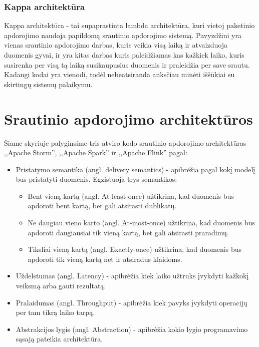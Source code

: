 \documentclass{VUMIFPSkursinis}
\begin{document}
\subsubsection{Kappa architektūra}

Kappa architektūra - tai supaprastinta lambda architektūra, kuri vietoj paketinio apdorojimo naudoja papildomą srautinio apdorojimo sistemą. Pavyzdžiui yra vienas srautinio apdorojimo darbas, kuris veikia visą laiką
ir atvaizduoja duomenis gyvai, ir yra kitas darbas kuris paleidžiamas kas kažkiek laiko, kuris susirenka per visą tą laiką susikaupusius duomenis ir praleidžia per save srautu. Kadangi kodai yra vienodi, todėl
nebeatsiranda anksčiau minėti iššūkiai su skirtingų sistemų palaikymu\cite{kreps2014questioning, kappa}.

\section{Srautinio apdorojimo architektūros} \label{srautarch}
Šiame skyriuje palyginsime tris atviro kodo srautinio apdorojimo architektūras ,,Apache Storm'', ,,Apache Spark'' ir ,,Apache Flink'' pagal:
\begin{itemize}
    \item Pristatymo semantika (angl. delivery semantics) - apibrėžia pagal kokį modelį bus pristatyti duomenis. Egzistuoja trys semantikos\cite{ensar20}: 
    \begin{itemize}
        \item Bent vieną kartą (angl. At-least-once) užtikrina, kad duomenis bus apdoroti bent kartą, bet gali atsirasti dublikatų. 
        \item Ne daugiau vieno karto (angl. At-most-once) užtikrina, kad duomenis bus apdoroti daugiausiai tik vieną kartą, bet gali atsirasti praradimų. 
        \item Tiksliai vieną kartą (angl. Exactly-once) užtikrina, kad duomenis bus apdoroti tik vieną kartą net ir atsiradus klaidoms.
    \end{itemize}
    \item Uždelstumas (angl. Latency) - apibrėžia kiek laiko užtruks įvykdyti kažkokį veiksmą arba gauti rezultatą.
    \item Pralaidumas (angl. Throughput) - apibrėžia kiek pavyks įvykdyti operacijų per tam tikrą laiko tarpą.
    \item Abstrakcijos lygis (angl. Abstraction) - apibrėžia kokio lygio programavimo sąsają pateikia architektūra.
\end{itemize}
\end{document}
